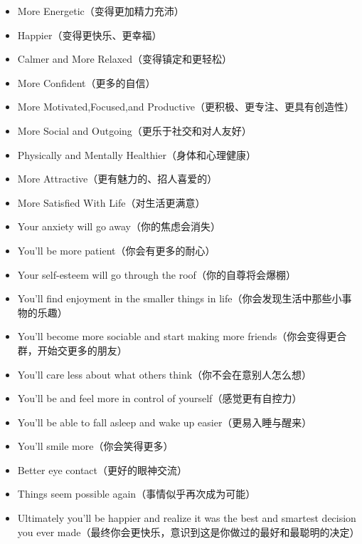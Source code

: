 \begin{itemize}
    \item More Energetic（变得更加精力充沛）
    \item Happier（变得更快乐、更幸福）
    \item Calmer and More Relaxed（变得镇定和更轻松）
    \item More Confident（更多的自信）
    \item More Motivated,Focused,and Productive（更积极、更专注、更具有创造性）
    \item More Social and Outgoing（更乐于社交和对人友好）
    \item Physically and Mentally Healthier（身体和心理健康）
    \item More Attractive（更有魅力的、招人喜爱的）
    \item More Satisfied With Life（对生活更满意）
    \item Your anxiety will go away（你的焦虑会消失）
    \item You'll be more patient（你会有更多的耐心）
    \item Your self-esteem will go through the roof（你的自尊将会爆棚）
    \item You'll find enjoyment in the smaller things in life（你会发现生活中那些小事物的乐趣）
    \item You'll become more sociable and start making more friends（你会变得更合群，开始交更多的朋友）
    \item You'll care less about what others think（你不会在意别人怎么想）
    \item You'll be and feel more in control of yourself（感觉更有自控力）
    \item You'll be able to fall asleep and wake up easier（更易入睡与醒来）
    \item You'll smile more（你会笑得更多）
    \item Better eye contact（更好的眼神交流）
    \item Things seem possible again（事情似乎再次成为可能）
    \item Ultimately you'll be happier and realize it was the best and smartest decision you ever made（最终你会更快乐，意识到这是你做过的最好和最聪明的决定）
\end{itemize}

